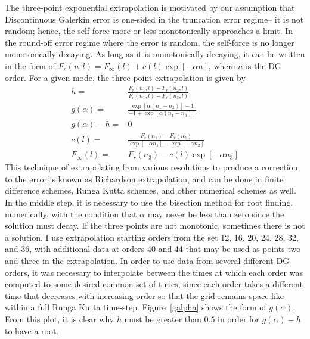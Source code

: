 The three-point exponential extrapolation is motivated by our assumption that Discontinuous Galerkin error is one-sided in the truncation error regime-- it is not random; hence, the self force more or less monotonically approaches a limit. In the round-off error regime where the error is random, the self-force is no longer monotonically decaying. As long as it is monotonically decaying, it can be written in the form of $F_r(n,l)=F_\infty(l)+c(l)\exp[-\alpha n]$, where $n$ is the DG order. For a given mode, the three-point extrapolation is given by
\begin{eqnarray}
h=&\frac{F_r(n_1,l)-F_r(n_2,l)}{F_r(n_1,l)-F_r(n_3,l)}\\
g(\alpha)=&\frac{\exp[\alpha(n_1-n_2)]-1}{-1+\exp[\alpha(n_1-n_3)]}\\
g(\alpha)-h=&0\\
c(l)=&\frac{F_r(n_1)-F_r(n_2)}{\exp[-\alpha n_1]-\exp[-\alpha n_2]}\\
F_\infty(l)=&F_r(n_3)-c(l)\exp[-\alpha n_3]
\end{eqnarray}
This technique of extrapolating from various resolutions to produce a correction to the error is known as Richardson extrapolation, and can be done in finite difference schemes, Runga Kutta schemes, and other numerical schemes as well. In the middle step, it is necessary to use the bisection method for root finding, numerically, with the condition that $\alpha$ may never be less than zero since the solution must decay. If the three points are not monotonic, sometimes there is not a solution. I use extrapolation starting orders from the set 12, 16, 20, 24, 28, 32, and 36, with additional data at orders 40 and 44 that may be used as points two and three in the extrapolation. In order to use data from several different DG orders, it was necessary to interpolate between the times at which each order was computed to some desired common set of times, since each order takes a different time that decreases with increasing order so that the grid remains space-like within a full Runga Kutta time-step. Figure~\ref{galpha} shows the form of $g(\alpha)$. From this plot, it is clear why $h$ must be greater than $0.5$ in order for $g(\alpha)-h$ to have a root. 


